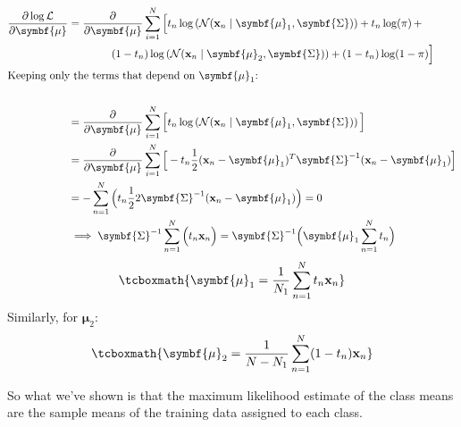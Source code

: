 \documentclass[11pt]{article}
\newcommand{\xb}{\mathbf{x}}
\newcommand{\ub}{\symbf{\mu}}
\newcommand{\uS}{\symbf{\Sigma}}
\begin{document}
\begin{framed}
\begin{align*}
	\frac{\partial \log \mathcal{L}}{\partial \ub} &= \frac{\partial}{\partial \ub}  \sum_{i=1}^{N} \Big[   t_n \log \left(\mathcal{N}(\xb_n \mid \ub_1, \uS)\right)  + t_n \log(\pi)  \, +  \\
			 & \quad \quad  \quad \quad  (1- t_n) \log \left(\mathcal{N}(\xb_n \mid \ub_2, \uS)\right)  + (1 - t_n) \log(1 - \pi)  \Big] \\
	\intertext{Keeping only the terms that depend on $\ub_1$:} \\
	&= \frac{\partial}{\partial \ub}  \sum_{i=1}^{N} \Big[   t_n \log \left(\mathcal{N}(\xb_n \mid \ub_1, \uS)\right)   \Big] \\
	&= \frac{\partial}{\partial \ub}  \sum_{i=1}^{N} \Big[   - t_n  \frac{1}{2} (\xb_n  - \ub_1)^T \uS^{-1} (\xb_n  - \ub_1)  \Big] \\
	& = - \sum_{n=1}^{N} \Big(t_n \frac{1}{2}  2  \uS^{-1} (\xb_n - \ub_1) \Big) = 0 \\
	&\implies \uS^{-1} \sum_{n=1}^{N} \Big(t_n  \xb_n  \Big) = \uS^{-1} \Big(  \ub_1  \sum_{n=1}^{N} t_n \Big)
\end{align*}
\begin{equation*}
	\tcboxmath{\ub_1 = \frac{1}{N_1} \sum_{n=1}^N t_n \xb_n} 
\end{equation*}
Similarly, for $\ub_2$:
\begin{equation*}
	\tcboxmath{\ub_2 = \frac{1}{N - N_1} \sum_{n=1}^N (1 - t_n) \xb_n}
\end{equation*}

So what we've shown is that the maximum likelihood estimate of the class means are the sample means of the training data assigned to each class.


\end{framed}
\end{document}
